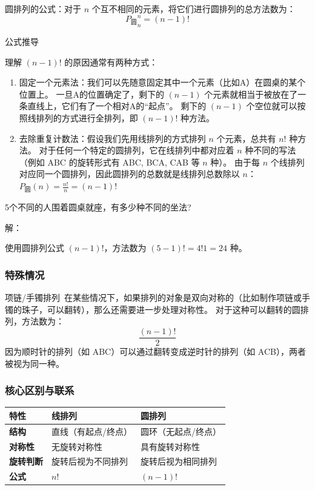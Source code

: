 圆排列的公式：对于 \(n\) 个互不相同的元素，将它们进行圆排列的总方法数为：
  \[{P_\textit{圆}}_n^n=(n-1)!\]

公式推导

理解 \((n-1)!\) 的原因通常有两种方式：
\begin{enumerate}
  \item 固定一个元素法：我们可以先随意固定其中一个元素（比如A）在圆桌的某个位置上。
    一旦A的位置确定了，剩下的 \((n-1)\) 个元素就相当于被放在了一条直线上，它们有了一个相对A的“起点”。
    剩下的 \((n-1)\) 个空位就可以按照线排列的方式进行全排列，即 \((n-1)!\) 种方法。
  \item 去除重复计数法：假设我们先用线排列的方式排列 \(n\) 个元素，总共有 \(n!\) 种方法。
    对于任何一个特定的圆排列，它在线排列中都对应着 \(n\) 种不同的写法（例如 ABC 的旋转形式有 ABC, BCA, CAB 等 \(n\) 种）。
    由于每 \(n\) 个线排列对应同一个圆排列，因此圆排列的总数就是线排列总数除以 \(n\)：\(P_\textbf{圆}(n)=\frac{n!}{n}=(n-1)!\) 
\end{enumerate}

\begin{example} 
5个不同的人围着圆桌就座，有多少种不同的坐法?

解：

  使用圆排列公式 \((n-1)!\)，方法数为 \((5-1)!=4!1=24\) 种。
\end{example}

\subsubsection{特殊情况}
项链/手镯排列 在某些情况下，如果排列的对象是双向对称的（比如制作项链或手镯的珠子，可以翻转），那么还需要进一步处理对称性。
对于这种可以翻转的圆排列，方法数为：
\[\frac{(n-1)!}{2}\]
因为顺时针的排列（如 ABC）可以通过翻转变成逆时针的排列（如 ACB），两者被视为同一种。


\subsubsection{核心区别与联系}
\begin{tabular}{@{}lll@{}}
\toprule
  \textbf{特性} & \textbf{线排列} & \textbf{圆排列}\\
\midrule
\textbf{结构} & 直线（有起点/终点） & 圆环（无起点/终点） \\
\textbf{对称性} & 无旋转对称性 & 具有旋转对称性 \\
\textbf{旋转判断} & 旋转后视为不同排列 & 旋转后视为相同排列 \\
\textbf{公式} & $n!$ & $(n-1)!$ \\
\bottomrule
\end{tabular}

